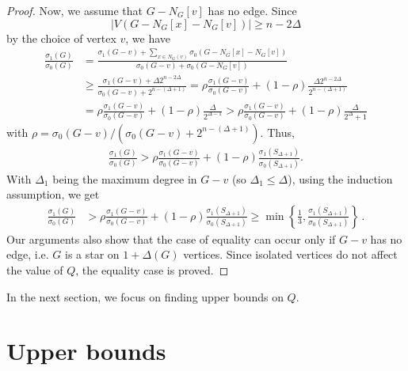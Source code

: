 \documentclass[a4paper,12pt]{amsart}
\newtheorem{prop}{Proposition}
\begin{document}
\begin{proof}
\medskip
Now, we assume that $G-N_G[v]$ has no edge. Since
 $$|V(G-N_G[x]-N_G[v])|\geq n- 2\Delta $$ by the choice of vertex $v$, we have
\begin{align*}
\frac{\sigma_1(G)}{\sigma_0(G)}
&=\frac{\sigma_1(G-v)+ \sum_{x\in N_G(v)}\sigma_0(G-N_G[x]-N_G[v])}{\sigma_0(G-v)+\sigma_0(G-N_G[v])}\\
&\geq \frac{\sigma_1(G-v)+\Delta 2^{n-2\Delta}}{\sigma_0(G-v)+2^{n-(\Delta +1)}}=\rho\frac{\sigma_1(G-v)}{\sigma_0(G-v)}+(1-\rho)\frac{\Delta 2^{n-2\Delta}}{2^{n-(\Delta +1)}}\\
&=\rho\frac{\sigma_1(G-v)}{\sigma_0(G-v)}+(1-\rho)\frac{\Delta}{2^{\Delta -1}}
>\rho\frac{\sigma_1(G-v)}{\sigma_0(G-v)}+(1-\rho)\frac{\Delta}{2^{\Delta}+1}
\end{align*}
with $\rho=\sigma_0(G-v) / (\sigma_0(G-v)+2^{n-(\Delta +1)} )$. Thus,
\begin{align*}
\frac{\sigma_1(G)}{\sigma_0(G)} > \rho\frac{\sigma_1(G-v)}{\sigma_0(G-v)}+(1-\rho)\frac{\sigma_1(S_{\Delta +1 })}{\sigma_0(S_{\Delta +1 })}.
\end{align*}
With $\Delta_1$ being the maximum degree in $G-v$ (so $\Delta_1\leq \Delta$), using the induction assumption, we get
\begin{align*}
\frac{\sigma_1(G)}{\sigma_0(G)}
&>\rho\frac{\sigma_1(G-v)}{\sigma_0(G-v)}+(1-\rho)\frac{\sigma_1(S_{\Delta +1 })}{\sigma_0(S_{\Delta +1 })}\geq \min\left\lbrace \frac{1}{3},\frac{\sigma_1(S_{\Delta +1 })}{\sigma_0(S_{\Delta +1 })} \right\rbrace \,.
\end{align*}
Our arguments also show that the case of equality can occur only if $G-v$ has no edge, i.e. $G$ is a star on $1+\Delta(G)$ vertices. Since isolated vertices do not affect the value of $Q$, the equality case is proved.
\end{proof}

\medskip
In the next section, we focus on finding upper bounds on $Q$.

\section{Upper bounds}
\label{Sec:UPP}


\end{document}
